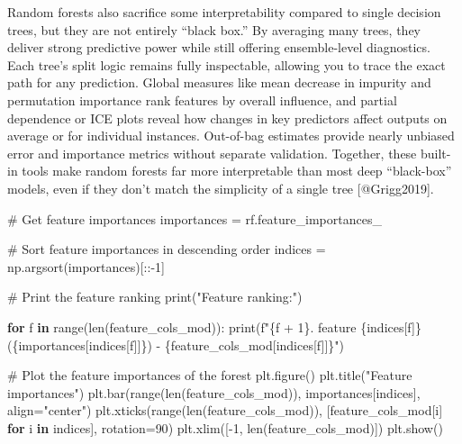 \documentclass[
  letterpaper,
  DIV=11,
  numbers=noendperiod]{scrartcl}
\newenvironment{Shaded}{\begin{snugshade}}{\end{snugshade}}
\newcommand{\BuiltInTok}[1]{\textcolor[rgb]{0.00,0.23,0.31}{#1}}
\newcommand{\CommentTok}[1]{\textcolor[rgb]{0.37,0.37,0.37}{#1}}
\newcommand{\ControlFlowTok}[1]{\textcolor[rgb]{0.00,0.23,0.31}{\textbf{#1}}}
\newcommand{\DecValTok}[1]{\textcolor[rgb]{0.68,0.00,0.00}{#1}}
\newcommand{\KeywordTok}[1]{\textcolor[rgb]{0.00,0.23,0.31}{\textbf{#1}}}
\newcommand{\NormalTok}[1]{\textcolor[rgb]{0.00,0.23,0.31}{#1}}
\newcommand{\OperatorTok}[1]{\textcolor[rgb]{0.37,0.37,0.37}{#1}}
\newcommand{\SpecialCharTok}[1]{\textcolor[rgb]{0.37,0.37,0.37}{#1}}
\newcommand{\SpecialStringTok}[1]{\textcolor[rgb]{0.13,0.47,0.30}{#1}}
\newcommand{\StringTok}[1]{\textcolor[rgb]{0.13,0.47,0.30}{#1}}
\begin{document}
Random forests also sacrifice some interpretability compared to single
decision trees, but they are not entirely ``black box.'' By averaging
many trees, they deliver strong predictive power while still offering
ensemble-level diagnostics. Each tree's split logic remains fully
inspectable, allowing you to trace the exact path for any prediction.
Global measures like mean decrease in impurity and permutation
importance rank features by overall influence, and partial dependence or
ICE plots reveal how changes in key predictors affect outputs on average
or for individual instances. Out-of-bag estimates provide nearly
unbiased error and importance metrics without separate validation.
Together, these built-in tools make random forests far more
interpretable than most deep ``black-box'' models, even if they don't
match the simplicity of a single tree {[}@Grigg2019{]}.

\begin{Shaded}
\begin{Highlighting}[]
\CommentTok{\# Get feature importances}
\NormalTok{importances }\OperatorTok{=}\NormalTok{ rf.feature\_importances\_}

\CommentTok{\# Sort feature importances in descending order}
\NormalTok{indices }\OperatorTok{=}\NormalTok{ np.argsort(importances)[::}\OperatorTok{{-}}\DecValTok{1}\NormalTok{]}

\CommentTok{\# Print the feature ranking}
\BuiltInTok{print}\NormalTok{(}\StringTok{"Feature ranking:"}\NormalTok{)}

\ControlFlowTok{for}\NormalTok{ f }\KeywordTok{in} \BuiltInTok{range}\NormalTok{(}\BuiltInTok{len}\NormalTok{(feature\_cols\_mod)):}
    \BuiltInTok{print}\NormalTok{(}\SpecialStringTok{f"}\SpecialCharTok{\{}\NormalTok{f }\OperatorTok{+} \DecValTok{1}\SpecialCharTok{\}}\SpecialStringTok{. feature }\SpecialCharTok{\{}\NormalTok{indices[f]}\SpecialCharTok{\}}\SpecialStringTok{ (}\SpecialCharTok{\{}\NormalTok{importances[indices[f]]}\SpecialCharTok{\}}\SpecialStringTok{) {-} }\SpecialCharTok{\{}\NormalTok{feature\_cols\_mod[indices[f]]}\SpecialCharTok{\}}\SpecialStringTok{"}\NormalTok{)}

\CommentTok{\# Plot the feature importances of the forest}
\NormalTok{plt.figure()}
\NormalTok{plt.title(}\StringTok{"Feature importances"}\NormalTok{)}
\NormalTok{plt.bar(}\BuiltInTok{range}\NormalTok{(}\BuiltInTok{len}\NormalTok{(feature\_cols\_mod)), importances[indices], align}\OperatorTok{=}\StringTok{"center"}\NormalTok{)}
\NormalTok{plt.xticks(}\BuiltInTok{range}\NormalTok{(}\BuiltInTok{len}\NormalTok{(feature\_cols\_mod)), [feature\_cols\_mod[i] }\ControlFlowTok{for}\NormalTok{ i }\KeywordTok{in}\NormalTok{ indices], rotation}\OperatorTok{=}\DecValTok{90}\NormalTok{)}
\NormalTok{plt.xlim([}\OperatorTok{{-}}\DecValTok{1}\NormalTok{, }\BuiltInTok{len}\NormalTok{(feature\_cols\_mod)])}
\NormalTok{plt.show()}
\end{Highlighting}
\end{Shaded}
\end{document}
